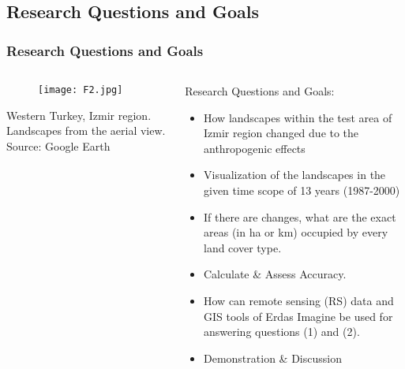 \documentclass[pdflatex,compress,8pt,
	xcolor={dvipsnames,dvipsnames,svgnames,x11names,table},
	hyperref={colorlinks = true,
	breaklinks = true, 
	urlcolor = NavyBlue, 
	breaklinks = true}]{beamer}
\begin{document}
\subsection{Research Questions and Goals}
\begin{frame}\frametitle{Research Questions and Goals}
\begin{minipage}[0.4\textheight]{\textwidth}
\begin{columns}[T]
\begin{column}{0.5\textwidth}
\vspace{2em}
\begin{figure}[H]
	\centering
		\texttt{[image: F2.jpg]}
\end{figure}
\footnotesize{Western Turkey, Izmir region. Landscapes from the aerial view. Source: Google Earth}
\end{column}
\begin{column}{0.5\textwidth}
\vspace{2em} 
Research Questions and Goals: 
\begin{itemize}
	\item How landscapes within the test area of Izmir region changed due to the anthropogenic effects 
	\item Visualization of the landscapes in the given time scope of 13 years (1987-2000)
	\item If there are changes, what are the exact areas (in ha or km) occupied by every land cover type.
	\item Calculate \& Assess Accuracy.
	\item How can remote sensing (RS) data and GIS tools of Erdas Imagine be used for answering questions (1) and (2). 
	\item Demonstration \& Discussion
\end{itemize}
\end{column}
\end{columns}
\end{minipage}
\end{frame}
\end{document}
